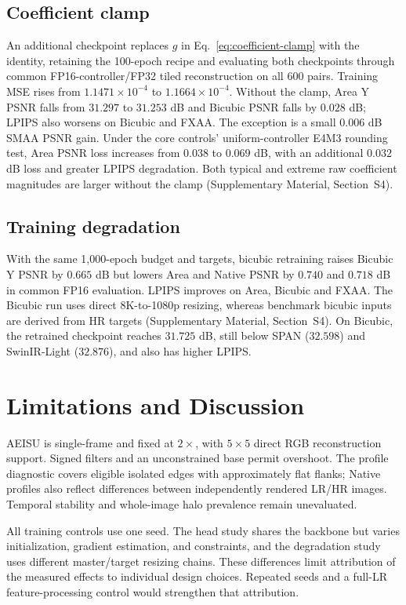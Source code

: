 \documentclass[10pt,twocolumn,letterpaper]{article}
\newcommand{\model}{AEISU}
\begin{document}
\subsection{Coefficient clamp}
\label{sec:clamp-ablation}
An additional checkpoint replaces $g$ in Eq.~\eqref{eq:coefficient-clamp} with the identity, retaining the 100-epoch recipe and evaluating both checkpoints through common FP16-controller/FP32 tiled reconstruction on all 600 pairs.
Training MSE rises from $1.1471\times10^{-4}$ to $1.1664\times10^{-4}$.
Without the clamp, Area Y PSNR falls from $31.297$ to $31.253$ dB and Bicubic PSNR falls by $0.028$ dB; LPIPS also worsens on Bicubic and FXAA.
The exception is a small $0.006$ dB SMAA PSNR gain.
Under the core controls' uniform-controller E4M3 rounding test, Area PSNR loss increases from $0.038$ to $0.069$ dB, with an additional $0.032$ dB loss and greater LPIPS degradation.
Both typical and extreme raw coefficient magnitudes are larger without the clamp (Supplementary Material, Section~S4).

\subsection{Training degradation}
\label{sec:training-degradation}
With the same 1,000-epoch budget and targets, bicubic retraining raises Bicubic Y PSNR by $0.665$ dB but lowers Area and Native PSNR by $0.740$ and $0.718$ dB in common FP16 evaluation.
LPIPS improves on Area, Bicubic and FXAA.
The Bicubic run uses direct 8K-to-1080p resizing, whereas benchmark bicubic inputs are derived from HR targets (Supplementary Material, Section~S4).
On Bicubic, the retrained checkpoint reaches $31.725$ dB, still below SPAN ($32.598$) and SwinIR-Light ($32.876$), and also has higher LPIPS.

\section{Limitations and Discussion}
\label{sec:limits}
\model{} is single-frame and fixed at $2\times$, with $5\times5$ direct RGB reconstruction support.
Signed filters and an unconstrained base permit overshoot.
The profile diagnostic covers eligible isolated edges with approximately flat flanks; Native profiles also reflect differences between independently rendered LR/HR images.
Temporal stability and whole-image halo prevalence remain unevaluated.

All training controls use one seed.
The head study shares the backbone but varies initialization, gradient estimation, and constraints, and the degradation study uses different master/target resizing chains.
These differences limit attribution of the measured effects to individual design choices.
Repeated seeds and a full-LR feature-processing control would strengthen that attribution.
\end{document}
